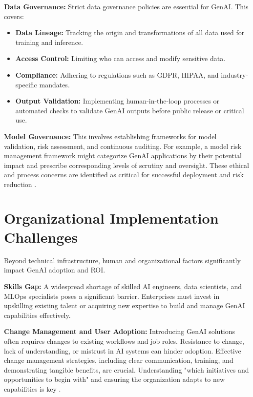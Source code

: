 \documentclass[10pt,journal,compsoc,twocolumn]{IEEEtran}
\begin{document}
\textbf{Data Governance:} Strict data governance policies are essential for GenAI. This covers:
\begin{itemize}
  \item \textbf{Data Lineage:} Tracking the origin and transformations of all data used for training and inference.
  \item \textbf{Access Control:} Limiting who can access and modify sensitive data.
  \item \textbf{Compliance:} Adhering to regulations such as GDPR, HIPAA, and industry-specific mandates.
  \item \textbf{Output Validation:} Implementing human-in-the-loop processes or automated checks to validate GenAI outputs before public release or critical use.
\end{itemize}

\textbf{Model Governance:} This involves establishing frameworks for model validation, risk assessment, and continuous auditing. For example, a model risk management framework might categorize GenAI applications by their potential impact and prescribe corresponding levels of scrutiny and oversight. These ethical and process concerns are identified as critical for successful deployment and risk reduction \cite{openalex_w4400993506}.


\section{Organizational Implementation Challenges}


Beyond technical infrastructure, human and organizational factors significantly impact GenAI adoption and ROI.

\textbf{Skills Gap:} A widespread shortage of skilled AI engineers, data scientists, and MLOps specialists poses a significant barrier. Enterprises must invest in upskilling existing talent or acquiring new expertise to build and manage GenAI capabilities effectively.

\textbf{Change Management and User Adoption:} Introducing GenAI solutions often requires changes to existing workflows and job roles. Resistance to change, lack of understanding, or mistrust in AI systems can hinder adoption. Effective change management strategies, including clear communication, training, and demonstrating tangible benefits, are crucial. Understanding "which initiatives and opportunities to begin with" and ensuring the organization adapts to new capabilities is key \cite{openalex_w4400993506}.
\end{document}
